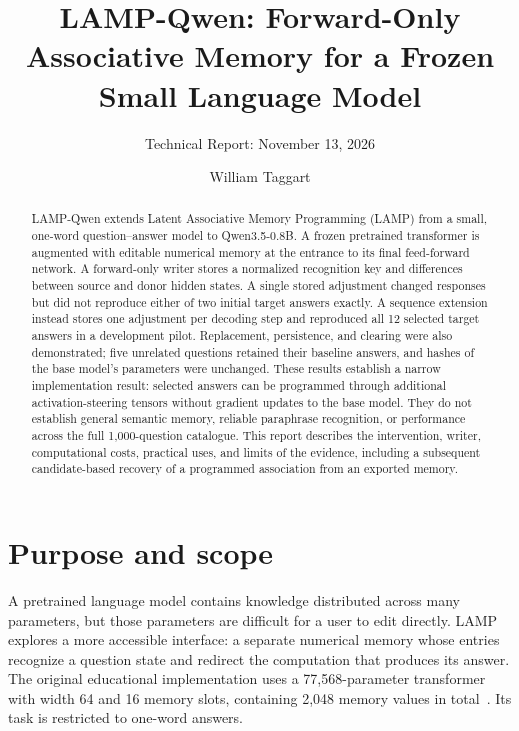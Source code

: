 \documentclass[manuscript,screen,nonacm]{acmart}
\begin{document}
\title{LAMP-Qwen: Forward-Only Associative Memory for a Frozen Small Language Model}
\author{William Taggart}
\subtitle{Technical Report: November 13, 2026}
\begin{abstract}
LAMP-Qwen extends Latent Associative Memory Programming (LAMP) from a small, one-word question--answer model to Qwen3.5-0.8B. A frozen pretrained transformer is augmented with editable numerical memory at the entrance to its final feed-forward network. A forward-only writer stores a normalized recognition key and differences between source and donor hidden states. A single stored adjustment changed responses but did not reproduce either of two initial target answers exactly. A sequence extension instead stores one adjustment per decoding step and reproduced all 12 selected target answers in a development pilot. Replacement, persistence, and clearing were also demonstrated; five unrelated questions retained their baseline answers, and hashes of the base model's parameters were unchanged. These results establish a narrow implementation result: selected answers can be programmed through additional activation-steering tensors without gradient updates to the base model. They do not establish general semantic memory, reliable paraphrase recognition, or performance across the full 1,000-question catalogue. This report describes the intervention, writer, computational costs, practical uses, and limits of the evidence, including a subsequent candidate-based recovery of a programmed association from an exported memory.
\end{abstract}
\maketitle

\section{Purpose and scope}
A pretrained language model contains knowledge distributed across many parameters, but those parameters are difficult for a user to edit directly. LAMP explores a more accessible interface: a separate numerical memory whose entries recognize a question state and redirect the computation that produces its answer. The original educational implementation uses a 77,568-parameter transformer with width 64 and 16 memory slots, containing 2,048 memory values in total~\cite{lamp}. Its task is restricted to one-word answers.
\end{document}
